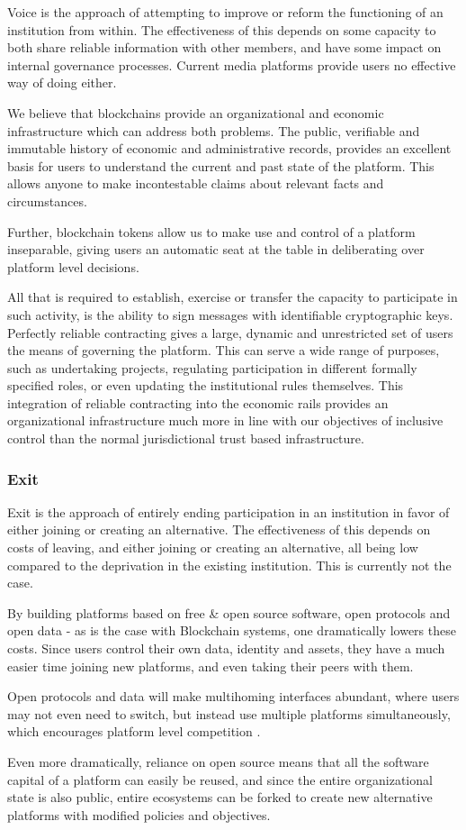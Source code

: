 \documentclass{article}
\begin{document}
Voice is the approach of attempting to improve or reform the functioning of an institution from within. The effectiveness of this depends on some capacity to both share reliable information with other members, and have some impact on internal governance processes. Current media platforms provide users no effective way of doing either.

We believe that blockchains provide an organizational and economic infrastructure which can address both problems. The public, verifiable and immutable history of economic and administrative records, provides an excellent basis for users to understand the current and past state of the platform. This allows anyone to make incontestable claims about relevant facts and circumstances.

Further, blockchain tokens allow us to make use and control of a platform inseparable, giving users an automatic seat at the table in deliberating over platform level decisions.

All that is required to establish, exercise or transfer the capacity to participate in such activity, is the ability to sign messages with identifiable cryptographic keys. Perfectly reliable contracting gives a large, dynamic and unrestricted set of users the means of governing the platform. This can serve a wide range of purposes, such as undertaking projects, regulating participation in different formally specified roles, or even updating the institutional rules themselves. This integration of reliable contracting into the economic rails provides an organizational infrastructure much more in line with our objectives of inclusive control than the normal jurisdictional trust based infrastructure.

\subsubsection{Exit}

Exit is the approach of entirely ending participation in an institution in favor of either joining or creating an alternative. The effectiveness of this depends on costs of leaving, and either joining or creating an alternative, all being low compared to the deprivation in the existing institution. This is currently not the case.

By building platforms based on free \& open source software, open protocols and open data - as is the case with Blockchain systems, one dramatically lowers these costs. Since users control their own data, identity and assets, they have a much easier time joining new platforms, and even taking their peers with them.

Open protocols and data will make multihoming interfaces abundant, where users may not even need to switch, but instead use multiple platforms simultaneously, which encourages platform level competition \cite{rochet2003platform}.

Even more dramatically, reliance on open source means that all the software capital of a platform can easily be reused, and since the entire organizational state is also public, entire ecosystems can be forked to create new alternative platforms with modified policies and objectives.



\end{document}
